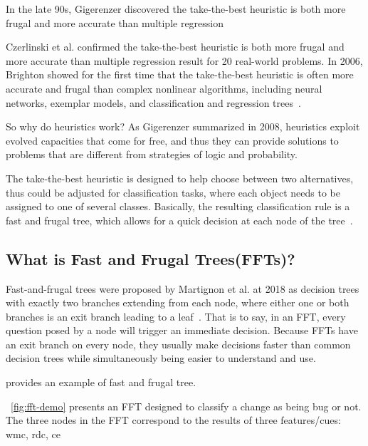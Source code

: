 \documentclass[table, xcdraw, sigconf,review, anonymous]{acmart}
\begin{document}
        In the late 90s, Gigerenzer discovered 
        the take-the-best heuristic is
        both more frugal and more accurate than 
        multiple regression
        
        Czerlinski et al. confirmed 
        the take-the-best heuristic is
        both more frugal and more accurate than 
        multiple regression result for 20 real-world problems\cite{czerlinski1999good}. 
        In 2006, Brighton showed for the first time that 
        the take-the-best heuristic is 
        often more accurate and frugal than
        complex nonlinear algorithms, including neural networks, 
        exemplar models, and classification and regression trees~\cite{brighton2006robust}. 
        
        So why do heuristics work? As Gigerenzer summarized in 2008, heuristics exploit evolved capacities that
        come for free, and thus they can provide solutions to problems
        that are different from strategies of logic and probability. 
        
        The take-the-best heuristic is designed to help choose
        between two alternatives, thus could be adjusted for 
        classification tasks, where each object needs to be assigned to
        one of several classes. 
        Basically, the resulting classification rule is a 
        fast and frugal tree, which allows for a quick decision 
        at each node of the tree~\cite{martignon2003naive}. 
        
    \subsection{What is Fast and Frugal Trees(FFTs)? }
        Fast-and-frugal trees were proposed by Martignon et al. at 2018
        as decision trees with exactly two branches extending
        from each node, where either one or both branches is an exit
        branch leading to a leaf~. 
        That is to say, in an FFT,  every question posed by a node will 
        trigger an immediate decision. Because FFTs have an exit
        branch on every node, they usually make decisions faster
        than common decision trees while
        simultaneously being easier to understand and use.
    
         provides an example of fast and frugal tree. 
        
        ~\ref{fig:fft-demo} presents an FFT designed to classify a change
        as being bug or not.
        The three nodes in the FFT correspond to the results of
        three features/cues: wmc, rdc, ce
        
\end{document}
